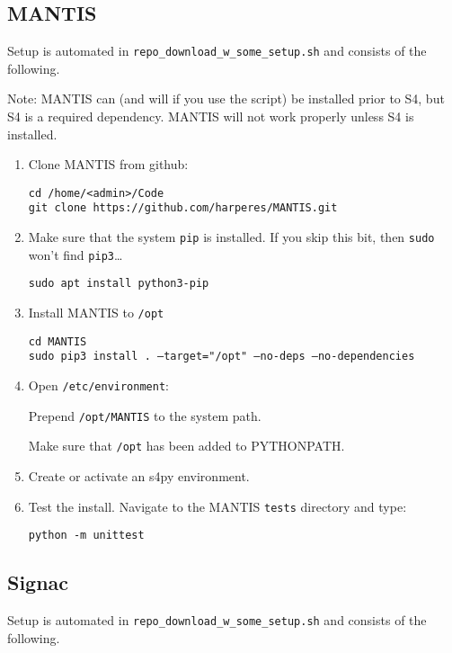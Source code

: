 \subsection{MANTIS} \label{subsec:installMANTIS}

Setup is automated in \texttt{repo\_download\_w\_some\_setup.sh} and consists of the following.

Note: MANTIS can (and will if you use the script) be installed prior to S4, but S4 is a required dependency. MANTIS will not work properly unless S4 is installed.

\begin{enumerate}
  \item Clone MANTIS from github:

    \texttt{cd /home/<admin>/Code} \\
    \texttt{git clone https://github.com/harperes/MANTIS.git}

  \item Make sure that the system \texttt{pip} is installed. If you skip this bit, then \texttt{sudo} won't find \texttt{pip3}\dots

    \texttt{sudo apt install python3-pip}

  \item Install MANTIS to \texttt{/opt}

    \texttt{cd MANTIS} \\
    \texttt{sudo pip3 install . --target="/opt" --no-deps --no-dependencies}

  \item Open \texttt{/etc/environment}:

    Prepend \texttt{/opt/MANTIS} to the system path.

    Make sure that \texttt{/opt} has been added to PYTHONPATH.

  \item Create or activate an s4py environment. 

  \item Test the install. Navigate to the MANTIS \texttt{tests} directory and type:

    \texttt{python -m unittest}
\end{enumerate}

\subsection{Signac} \label{subsec:installSignac}

Setup is automated in \texttt{repo\_download\_w\_some\_setup.sh} and consists of the following.

